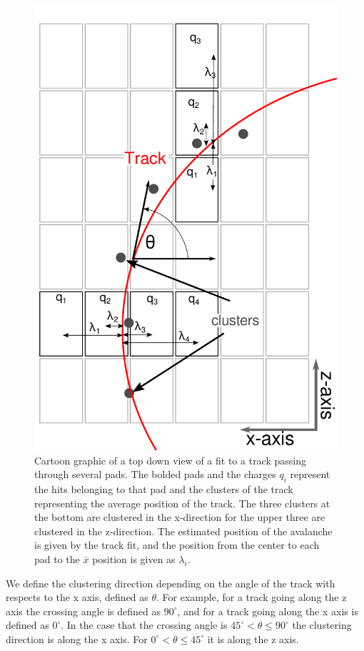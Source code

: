 \documentclass[review]{elsarticle}
\begin{document}
\begin{figure}[ht!]
\includegraphics[scale=.5]{top_view_helix_ext.pdf}
\caption{Cartoon graphic of a top down view of a fit to a track passing through several pads. The bolded pads and the charges $q_i$ represent the hits belonging to that pad and the clusters of the track representing the average position of the track. The three clusters at the bottom are clustered in the x-direction for the upper three are clustered in the z-direction. The estimated position of the avalanche is given by the track fit, and the position from the center to each pad to the $\bar{x}$ position is given as $\lambda_i$.}
\label{fig:topview}
\end{figure}

We define the clustering direction depending on the angle  of the track with respects to the x axis, defined as $\theta$. For example, for a track going along the z axis the crossing angle is defined as $90^{\circ}$, and for a track going along the x axis is defined as $0^{\circ}$. In the case that the crossing angle is $45^{\circ} < \theta \leq 90^{\circ} $ the clustering direction is along the x axis. For $0^{\circ} < \theta \leq 45^{\circ}$ it is along the z axis. 
\end{document}
